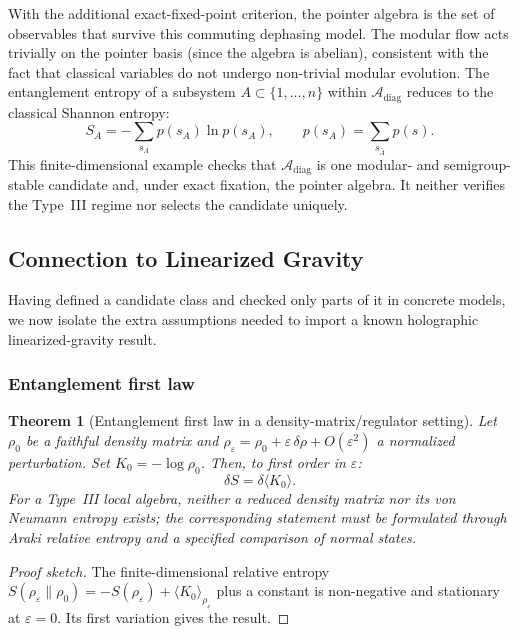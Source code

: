 \documentclass[12pt,a4paper]{article}
\newtheorem{theorem}{Theorem}[section]
\begin{document}
With the additional exact-fixed-point criterion, the pointer algebra is the set of observables that survive this commuting dephasing model.
The modular flow acts trivially on the pointer basis (since the algebra is abelian), consistent with the fact that classical variables do not undergo non-trivial modular evolution.
The entanglement entropy of a subsystem $A \subset \{1, \ldots, n\}$ within $\mathcal{A}_{\mathrm{diag}}$ reduces to the classical Shannon entropy:
\begin{equation}
S_A = -\sum_{s_A} p(s_A) \ln p(s_A), \qquad p(s_A) = \sum_{s_{\bar{A}}} p(s).
\end{equation}
This finite-dimensional example checks that $\mathcal A_{\mathrm{diag}}$ is one modular- and semigroup-stable candidate and, under exact fixation, the pointer algebra.  It neither verifies the Type~III regime nor selects the candidate uniquely.


\subsection{Connection to Linearized Gravity}
\label{sec:linearized}

Having defined a candidate class and checked only parts of it in concrete models, we now isolate the extra assumptions needed to import a known holographic linearized-gravity result.

\subsubsection{Entanglement first law}

\begin{theorem}[Entanglement first law in a density-matrix/regulator setting]
\label{thm:first-law}
Let $\rho_0$ be a faithful density matrix and $\rho_\varepsilon=\rho_0+\varepsilon\,\delta\rho+O(\varepsilon^2)$ a normalized perturbation.  Set $K_0=-\log\rho_0$.
Then, to first order in $\varepsilon$:
\begin{equation}
\delta S = \delta \langle K_0 \rangle.
\end{equation}
For a Type~III local algebra, neither a reduced density matrix nor its von Neumann entropy exists; the corresponding statement must be formulated through Araki relative entropy and a specified comparison of normal states.
\end{theorem}

\begin{proof}[Proof sketch]
The finite-dimensional relative entropy $S(\rho_\varepsilon\|\rho_0)=-S(\rho_\varepsilon)+\langle K_0\rangle_{\rho_\varepsilon}$ plus a constant is non-negative and stationary at $\varepsilon=0$.  Its first variation gives the result.
\end{proof}
\end{document}
